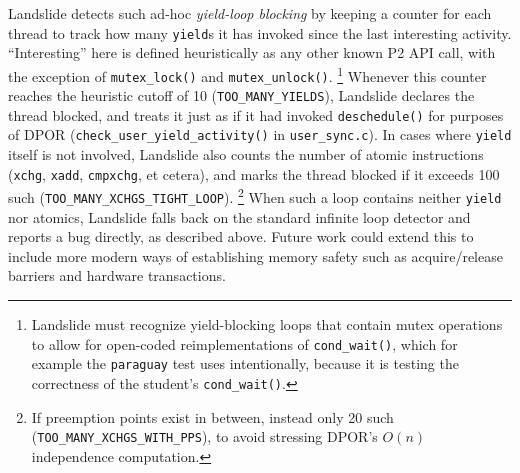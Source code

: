 Landslide detects such ad-hoc {\em yield-loop blocking}
by keeping a counter for each thread to track how many {\tt yield}s it has invoked since the last interesting activity.
``Interesting'' here is defined heuristically as any other known P2 API call,
with the exception of {\tt mutex\_lock()} and {\tt mutex\_unlock()}.%
\footnote{Landslide must recognize yield-blocking loops that contain mutex operations
to allow for open-coded reimplementations of {\tt cond\_wait()},
which for example the {\tt paraguay} test uses intentionally,
because it is testing the correctness of the student's {\tt cond\_wait()}.}
Whenever this counter reaches the heuristic cutoff of 10 ({\tt TOO\_MANY\_YIELDS}),
Landslide declares the thread blocked,
and treats it just as if it had invoked {\tt deschedule()} for purposes of DPOR
({\tt check\_user\_yield\_activity()} in {\tt user\_sync.c}).
%
In cases where {\tt yield} itself is not involved,
Landslide also counts the number of atomic instructions ({\tt xchg}, {\tt xadd}, {\tt cmpxchg}, et cetera),
and marks the thread blocked if it exceeds 100 such ({\tt TOO\_MANY\_XCHGS\_TIGHT\_LOOP}).%
\footnote{If preemption points exist in between, instead only 20 such ({\tt TOO\_MANY\_XCHGS\_WITH\_PPS}),
to avoid stressing DPOR's $O(n)$ independence computation.}
When such a loop contains neither {\tt yield} nor atomics,
Landslide falls back on the standard infinite loop detector and reports a bug directly, as described above.
Future work could extend this to include more modern ways of establishing memory safety such as
acquire/release barriers
and hardware transactions.

